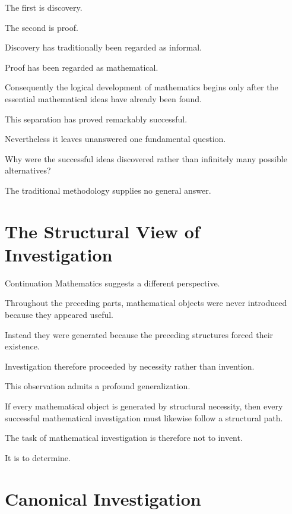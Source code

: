 \documentclass[13pt,openany]{book}
\theoremstyle{plain}
\theoremstyle{definition}
\begin{document}
The first is discovery.

The second is proof.

Discovery has traditionally been regarded as informal.

Proof has been regarded as mathematical.

Consequently the logical development of mathematics begins only after the
essential mathematical ideas have already been found.

This separation has proved remarkably successful.

Nevertheless it leaves unanswered one fundamental question.

Why were the successful ideas discovered rather than infinitely many possible
alternatives?

The traditional methodology supplies no general answer.

\section{The Structural View of Investigation}

Continuation Mathematics suggests a different perspective.

Throughout the preceding parts, mathematical objects were never introduced
because they appeared useful.

Instead they were generated because the preceding structures forced their
existence.

Investigation therefore proceeded by necessity rather than invention.

This observation admits a profound generalization.

If every mathematical object is generated by structural necessity, then every
successful mathematical investigation must likewise follow a structural path.

The task of mathematical investigation is therefore not to invent.

It is to determine.

\section{Canonical Investigation}
\end{document}
